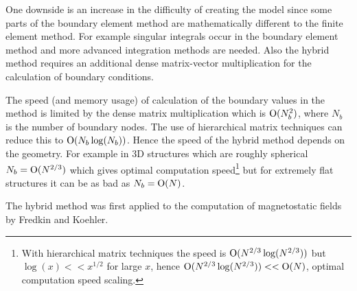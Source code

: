 One downside is an increase in the difficulty of creating the model since some parts of the boundary element method are mathematically different to the finite element method.
For example singular integrals occur in the boundary element method and more advanced integration methods are needed.
Also the hybrid method requires an additional dense matrix-vector multiplication for the calculation of boundary conditions.

The speed (and memory usage) of calculation of the boundary values in the method is limited by the dense matrix multiplication which is $\text{O}(N_b^2)$, where $N_b$ is the number of boundary nodes.
The use of hierarchical matrix techniques can reduce this to $\text{O}(N_b \log(N_b))$.\cite{Knittel2009} Hence the speed of the hybrid method depends on the geometry.
For example in 3D structures which are roughly spherical $N_b = \text{O}(N^{2/3})$ which gives optimal computation speed\footnote{With hierarchical matrix techniques the speed is $\text{O}(N^{2/3}\log(N^{2/3}))$ but $\log(x) << x^{1/2}$ for large $x$, hence $\text{O}(N^{2/3}\log(N^{2/3})) << \text{O}(N)$, \ie optimal computation speed scaling.} but for extremely flat structures it can be as bad as $N_b = \text{O}(N)$.

The hybrid method was first applied to the computation of magnetostatic fields by Fredkin and Koehler.\cite{Fredkin1990}





